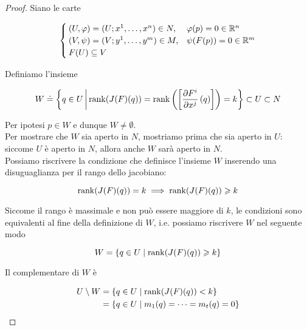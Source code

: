\begin{proof}
	Siano le carte
	
	\begin{equation}
		\begin{cases}
			(U,\varphi) = (U; x^{1},\dots,x^{n}) \in N, & \varphi(p) = 0 \in \mathbb{R}^{n} \\
			(V,\psi) = (V; y^{1},\dots,y^{m}) \in M, & \psi(F(p)) = 0  \in \mathbb{R}^{m} \\
			F(U) \subseteq V
		\end{cases}
	\end{equation}

	Definiamo l'insieme
	
	\begin{equation}
		W \doteq \left\{ q \in U \, \middle| \, \rank(J(F)(q)) = \rank \left( \left[ \pdv{F^{i}}{x^{j}} \, (q) \right] \right) = k \right\} \subset U \subset N
	\end{equation}

	Per ipotesi $ p \in W $ e dunque $ W \neq \emptyset $. \\
	Per mostrare che $ W $ sia aperto in $ N $, mostriamo prima che sia aperto in $ U $: siccome $ U $ è aperto in $ N $, allora anche $ W $ sarà aperto in $ N $. \\
	Possiamo riscrivere la condizione che definisce l'insieme $ W $ inserendo una disuguaglianza per il rango dello jacobiano:
	
	\begin{equation}
		\rank(J(F)(q)) = k %
		\implies %
		\rank(J(F)(q)) \geqslant k
	\end{equation}

	Siccome il rango è massimale e non può essere maggiore di $ k $, le condizioni sono equivalenti al fine della definizione di $ W $, i.e. possiamo riscrivere $ W $ nel seguente modo
	
	\begin{equation}
		W = \{ q \in U \mid \rank(J(F)(q)) \geqslant k \}
	\end{equation}

	Il complementare di $ W $ è
	
	\begin{align}
		\begin{split}
			U \setminus W &= \{ q \in U \mid \rank(J(F)(q)) < k \} \\
			&= \{ q \in U \mid m_{1}(q) = \cdots = m_{t}(q) = 0 \}
		\end{split}
	\end{align}


\end{proof}
